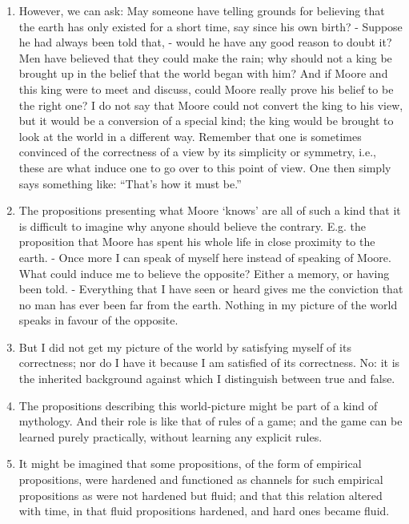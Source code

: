 \documentclass{book}
\begin{document}
\begin{enumerate}
\item
However, we can ask: May someone have telling grounds for believing that the
earth has only existed for a short time, say since his own birth? - Suppose he
had always been told that, - would he have any good reason to doubt it? Men
have believed that they could make the rain; why should not a king be brought
up in the belief that the world began with him? And if Moore and this king were
to meet and discuss, could Moore really prove his belief to be the right one? I
do not say that Moore could not convert the king to his view, but it would be a
conversion of a special kind; the king would be brought to look at the world in
a different way.  Remember that one is sometimes convinced of the correctness
of a view by its simplicity or symmetry, i.e., these are what induce one to go
over to this point of view. One then simply says something like: ``That's how
it must be.''

\item
The propositions presenting what Moore `knows' are all of such a kind that it
is difficult to imagine why anyone should believe the contrary. E.g. the
proposition that Moore has spent his whole life in close proximity to the
earth. - Once more I can speak of myself here instead of speaking of Moore.
What could induce me to believe the opposite? Either a memory, or having been
told. - Everything that I have seen or heard gives me the conviction that no
man has ever been far from the earth. Nothing in my picture of the world speaks
in favour of the opposite.

\item
But I did not get my picture of the world by satisfying myself of its
correctness; nor do I have it because I am satisfied of its correctness. No: it
is the inherited background against which I distinguish between true and false.

\item
The propositions describing this world-picture might be part of a kind of
mythology. And their role is like that of rules of a game; and the game can be
learned purely practically, without learning any explicit rules.

\item
It might be imagined that some propositions, of the form of empirical
propositions, were hardened and functioned as channels for such empirical
propositions as were not hardened but fluid; and that this relation altered
with time, in that fluid propositions hardened, and hard ones became fluid.


\end{enumerate}
\end{document}
